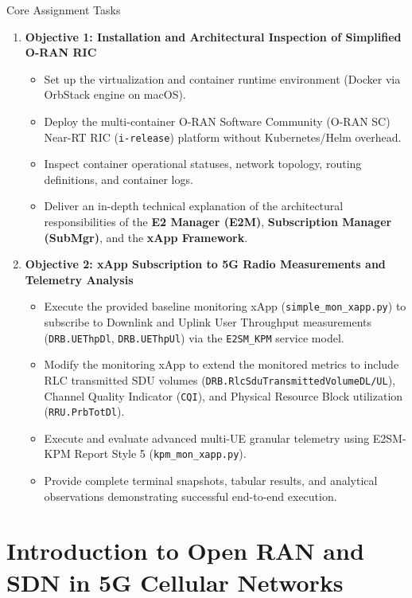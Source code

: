 \documentclass[11pt,a4paper]{article}
\begin{document}
\begin{calloutbox}{Core Assignment Tasks}
\begin{enumerate}
    \item \textbf{Objective 1: Installation and Architectural Inspection of Simplified O-RAN RIC}
    \begin{itemize}
        \item Set up the virtualization and container runtime environment (Docker via OrbStack engine on macOS).
        \item Deploy the multi-container O-RAN Software Community (O-RAN SC) Near-RT RIC (\texttt{i-release}) platform without Kubernetes/Helm overhead.
        \item Inspect container operational statuses, network topology, routing definitions, and container logs.
        \item Deliver an in-depth technical explanation of the architectural responsibilities of the \textbf{E2 Manager (E2M)}, \textbf{Subscription Manager (SubMgr)}, and the \textbf{xApp Framework}.
    \end{itemize}
    \item \textbf{Objective 2: xApp Subscription to 5G Radio Measurements and Telemetry Analysis}
    \begin{itemize}
        \item Execute the provided baseline monitoring xApp (\texttt{simple\_mon\_xapp.py}) to subscribe to Downlink and Uplink User Throughput measurements (\texttt{DRB.UEThpDl}, \texttt{DRB.UEThpUl}) via the \texttt{E2SM\_KPM} service model.
        \item Modify the monitoring xApp to extend the monitored metrics to include RLC transmitted SDU volumes (\texttt{DRB.RlcSduTransmittedVolumeDL/UL}), Channel Quality Indicator (\texttt{CQI}), and Physical Resource Block utilization (\texttt{RRU.PrbTotDl}).
        \item Execute and evaluate advanced multi-UE granular telemetry using E2SM-KPM Report Style 5 (\texttt{kpm\_mon\_xapp.py}).
        \item Provide complete terminal snapshots, tabular results, and analytical observations demonstrating successful end-to-end execution.
    \end{itemize}
\end{enumerate}
\end{calloutbox}

\section{Introduction to Open RAN and SDN in 5G Cellular Networks}
\end{document}
